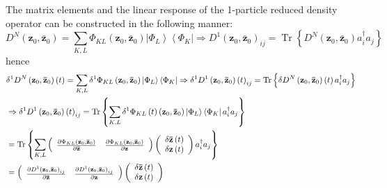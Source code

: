 \documentclass[aps,preprint]{revtex4}%
\begin{document}
The matrix elements and the linear response of the 1-particle reduced density
operator can be constructed in the following manner:%
\begin{equation}
D^{N}\left(  \mathbf{z}_{0},\mathbf{\bar{z}}_{0}\right)  =\sum_{K,L}\Phi
_{KL}\left(  \mathbf{z}_{0},\mathbf{\bar{z}}_{0}\right)  \left\vert \Phi
_{L}\right\rangle \left\langle \Phi_{K}\right\vert \Rightarrow D^{1}\left(
\mathbf{z}_{0},\mathbf{\bar{z}}_{0}\right)  _{ij}=\operatorname{Tr}\left\{
D^{N}\left(  \mathbf{z}_{0},\mathbf{\bar{z}}_{0}\right)  a_{i}^{\dagger}%
a_{j}\right\}
\end{equation}
hence
\begin{align}
&  \delta^{1}D^{N}\left(  \mathbf{z}_{0},\mathbf{\bar{z}}_{0}\right)  \left(
t\right)  =\sum_{K,L}\delta^{1}\Phi_{KL}\left(  \mathbf{z}_{0},\mathbf{\bar
{z}}_{0}\right)  \left\vert \Phi_{L}\right\rangle \left\langle \Phi
_{K}\right\vert \Rightarrow\delta^{1}D^{1}\left(  \mathbf{z}_{0}%
,\mathbf{\bar{z}}_{0}\right)  \left(  t\right)  _{ij}=\operatorname{Tr}%
\left\{  \delta D^{N}\left(  \mathbf{z}_{0},\mathbf{\bar{z}}_{0}\right)
\left(  t\right)  a_{i}^{\dagger}a_{j}\right\} \nonumber\\
&  \Rightarrow\delta^{1}D^{1}\left(  \mathbf{z}_{0},\mathbf{\bar{z}}%
_{0}\right)  \left(  t\right)  _{ij}=\operatorname{Tr}\left\{  \sum
_{K,L}\delta^{1}\Phi_{KL}\left(  t\right)  \left(  \mathbf{z}_{0}%
,\mathbf{\bar{z}}_{0}\right)  \left\vert \Phi_{L}\right\rangle \left\langle
\Phi_{K}\right\vert a_{i}^{\dagger}a_{j}\right\} \nonumber\\
&  =\operatorname{Tr}\left\{  \sum_{K,L}\left(
\begin{array}
[c]{cc}%
\frac{\partial\Phi_{KL}\left(  \mathbf{z}_{0},\mathbf{\bar{z}}_{0}\right)
}{\partial\mathbf{\bar{z}}} & \frac{\partial\Phi_{KL}\left(  \mathbf{z}%
_{0},\mathbf{\bar{z}}_{0}\right)  }{\partial\mathbf{z}}%
\end{array}
\right)  \left(
\begin{array}
[c]{c}%
\delta\mathbf{\bar{z}}\left(  t\right) \\
\delta\mathbf{z}\left(  t\right)
\end{array}
\right)  a_{i}^{\dagger}a_{j}\right\} \nonumber\\
&  =\left(
\begin{array}
[c]{cc}%
\frac{\partial D^{1}\left(  \mathbf{z}_{0},\mathbf{\bar{z}}_{0}\right)  _{ij}%
}{\partial\mathbf{\bar{z}}} & \frac{\partial D^{1}\left(  \mathbf{z}%
_{0},\mathbf{\bar{z}}_{0}\right)  _{ij}}{\partial\mathbf{z}}%
\end{array}
\right)  \left(
\begin{array}
[c]{c}%
\delta\mathbf{\bar{z}}\left(  t\right) \\
\delta\mathbf{z}\left(  t\right)
\end{array}
\right)
\end{align}
\end{document}
